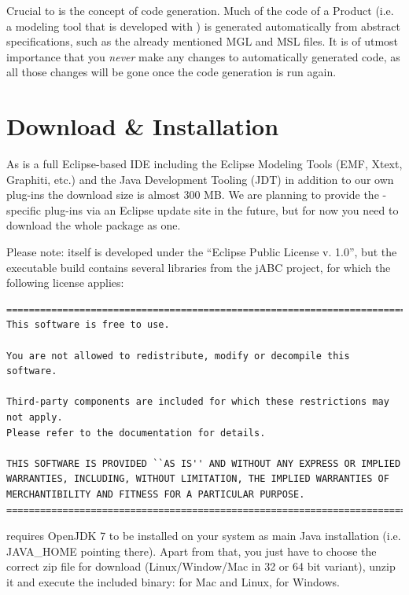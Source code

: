 \documentclass[a4paper,american,12pt]{scrreprt}
\begin{document}
Crucial to \cinco is the concept of code generation. Much of the code of a
\cinco Product (i.e. a modeling tool that is developed with \cinco) is generated
automatically from abstract specifications, such as the already mentioned
MGL and MSL files. It is of utmost importance that you \emph{never} make any
changes to automatically generated code\footnotemark{}, as all those changes will be
gone once the code generation is run again.


\section{Download \& Installation}

As \cinco{} is a full Eclipse-based IDE including the Eclipse Modeling Tools
(EMF, Xtext, Graphiti, etc.) and the Java Development Tooling (JDT) in addition
to our own plug-ins the download size is almost 300 MB. We are planning to
provide the \cinco{}-specific plug-ins via an Eclipse update site in the future,
but for now you need to download the whole package as one.

Please note: \cinco{} itself is developed under the ``Eclipse Public License v. 1.0'', 
but the executable build contains several libraries from the jABC
project, for which the following license applies:

\begin{verbatim}
===============================================================================
This software is free to use.

You are not allowed to redistribute, modify or decompile this software.

Third-party components are included for which these restrictions may not apply.
Please refer to the documentation for details.

THIS SOFTWARE IS PROVIDED ``AS IS'' AND WITHOUT ANY EXPRESS OR IMPLIED
WARRANTIES, INCLUDING, WITHOUT LIMITATION, THE IMPLIED WARRANTIES OF
MERCHANTIBILITY AND FITNESS FOR A PARTICULAR PURPOSE.
===============================================================================
\end{verbatim}

\cinco{} requires OpenJDK 7 to be installed on your system as main Java
installation (i.e. JAVA\_HOME pointing there). Apart from that, you just have to
choose the correct zip file for download (Linux/Window/Mac in 32 or 64 bit
variant), unzip it and execute the included binary:  for Mac and
Linux,  for Windows.
\end{document}
